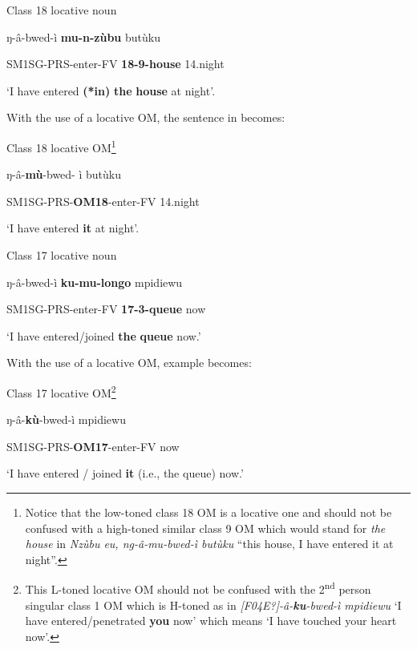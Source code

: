 \documentclass[output=paper]{langscibook}
\begin{document}
\ea%
    \label{ex:lukusa:9}
    \z

            Class 18 locative noun

    ŋ-â-bwed-ì            \textbf{mu-n-zùbu}    butùku

    SM1SG-PRS-enter-FV    \textbf{18-9-house}    14.night

\glt ‘I have entered \textbf{(*in)} \textbf{the} \textbf{house} at night’.

With the use of a locative OM, the sentence in  becomes:

\ea%
    \label{ex:lukusa:10}
    \z

          Class 18 locative OM\footnote{Notice that the low-toned class 18 OM is a locative one and should not be confused with a high-toned similar class 9 OM which would stand for \textit{the house} in \textit{Nzùbu eu, ng-â-mu-bwed-ì butùku} “this house, I have entered it at night”.}

ŋ-â-\textbf{mù}{}-bwed-  ì             butùku  

SM1SG-PRS-\textbf{OM18}{}-enter-FV    14.night

\glt ‘I have entered \textbf{it} at night’.

\ea%
    \label{ex:lukusa:11}
    \z

           Class 17 locative noun

ŋ-â-bwed-ì            \textbf{ku-mu-longo}    mpidiewu

    SM1SG-PRS-enter-FV    \textbf{17-3-queue}    now

\glt ‘I have entered/joined \textbf{the} \textbf{queue} now.’

With the use of a locative OM, example  becomes:

\ea%
    \label{ex:lukusa:12}
    \z

          Class 17 locative OM\footnote{This L-toned locative OM should not be confused with the 2\textsuperscript{nd} person singular class 1 OM which is H-toned as in \textrm{\textit{[F04E?]}}\textit{{}-â-}\textbf{\textit{ku}}\textit{{}-bwed-ì mpidiewu} ‘I have entered/penetrated \textbf{you} now’ which means ‘I have touched your heart now’.}

ŋ-â-\textbf{kù}{}-bwed-ì             mpidiewu

SM1SG-PRS-\textbf{OM17}{}-enter-FV    now

\glt ‘I have entered / joined \textbf{it} (i.e., the queue) now.’

\ea%
    \label{ex:lukusa:13}
    \z
\end{document}
